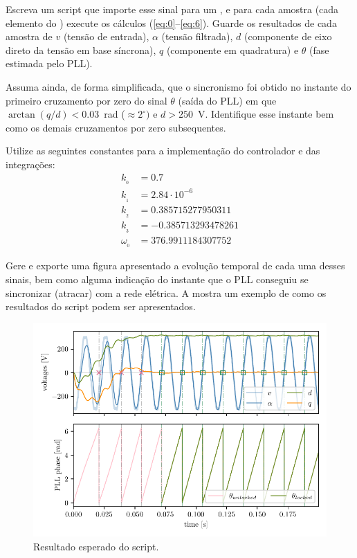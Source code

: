 Escreva um script que importe esse sinal para um , e para cada amostra (cada elemento do )
execute os cálculos (\ref{eq:0}--\ref{eq:6}).
Guarde os resultados de cada amostra de $v$ (tensão de entrada), $\alpha$ (tensão filtrada), $d$ (componente de eixo
direto da tensão em base síncrona), $q$ (componente em quadratura) e $\theta$ (fase estimada pelo PLL).

Assuma ainda, de forma simplificada, que o sincronismo foi obtido no instante do primeiro cruzamento por zero do sinal
$\theta$ (saída do PLL) em que $\arctan(q/d) < 0.03$~rad ($\approx 2^\circ)$ e $d > 250$~V. Identifique esse instante
bem como os demais cruzamentos por zero subsequentes.

Utilize as seguintes constantes para a implementação do controlador e das integrações:
\begin{equation}\label{eq:cont}
    \begin{aligned}
        k_{_0} &= 0.7 \\
        k_{_1} &= 2.84\cdot 10^{-6} \\
        k_{_2} &= 0.385715277950311 \\
        k_{_3} &= -0.385713293478261 \\
        \omega_{_0} &= 376.9911184307752
    \end{aligned}
\end{equation}

Gere e exporte uma figura apresentado a evolução temporal de cada uma desses sinais, bem como alguma indicação do
instante que o PLL conseguiu se sincronizar (atracar) com a rede elétrica.
A  mostra um exemplo de como os resultados do script podem ser
apresentados.
\begin{figure}[htbp]
    \centering
    \includegraphics[scale=1.0]{figs/plot_pll}
    \caption{Resultado esperado do script.}
    \label{fig:plot}
\end{figure}





